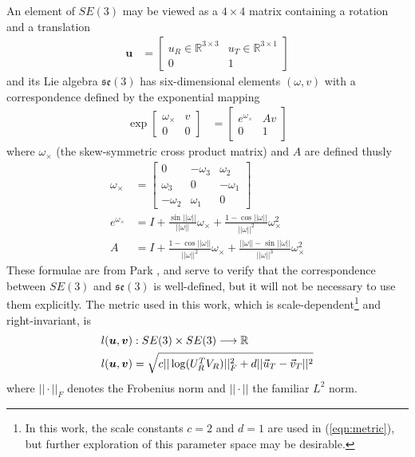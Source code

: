 \documentclass[letterpaper, 10 pt, conference]{ieeeconf}  %
\newcommand\mat[2]{\ensuremath{\left[\begin{array}{#1}#2\end{array}\right]}}
\def\xmat{\uppercase}    \def\xmatstr{in uppercase}
\def\xvec{\vec}          \def\xvecstr{with an arrow}
\def\xse{\bm}            \def\xsestr{in boldface}
\begin{document}
An element of $SE(3)$ may be viewed as a $4 \times 4$ matrix containing a rotation and a translation
\begin{align}
  \xse{u} &= \mat{c|c}{ u_R \in \mathbb{R}^{3 \times 3} & u_T \in \mathbb{R}^{3 \times 1} \\\hline 0 & 1 }
\end{align}
and its Lie algebra $\mathfrak{se}(3)$ has six-dimensional elements $(\omega, v)$ with a correspondence defined by the exponential mapping
\begin{align}
  \exp{\mat{c|c}{ \omega_\times & v \\\hline 0 & 0 }} &= \mat{c|c}{ e^{\omega_\times} & Av \\\hline 0 & 1}
\end{align}
where $\omega_\times$ (the skew-symmetric cross product matrix) and $A$ are defined thusly
\begin{align}
  \omega_\times &= \mat{ccc}{ 0 & -\omega_3 & \omega_2 \\ \omega_3 & 0 & -\omega_1 \\ -\omega_2 & \omega_1 & 0 } \\
  e^{\omega_\times} &= I + \frac{\sin||\omega||}{||\omega||} \omega_\times + \frac{1 - \cos{||\omega||}}{||\omega||^2} \omega_\times^2 \\
  A &= I + \frac{1 - \cos{||\omega||}}{||\omega||^2} \omega_\times + \frac{||\omega|| - \sin{||\omega||}}{||\omega||^3} \omega_\times^2
\end{align}
These formulae are from Park \cite{Park1995}, and serve to verify that the correspondence between $SE(3)$ and $\mathfrak{se}(3)$ is well-defined, but it will not be necessary to use them explicitly. The metric used in this work, which is scale-dependent\footnote{In this work, the scale constants $c=2$ and $d=1$ are used in (\ref{eqn:metric}), but further exploration of this parameter space may be desirable.} and right-invariant, is
\begin{align}
  l&(\xse{u},\xse{v}) : SE(3) \times SE(3) \longrightarrow \mathbb{R} \\
  l&(\xse{u},\xse{v}) = \sqrt{c ||\log(\xmat{u}_R^T \xmat{v}_R)||_F^2 + d ||\xvec{u}_T - \xvec{v}_T||^2} \nonumber
\end{align}
where $||\cdot||_F$ denotes the Frobenius norm and $||\cdot||$ the familiar $L^2$ norm.
\end{document}
